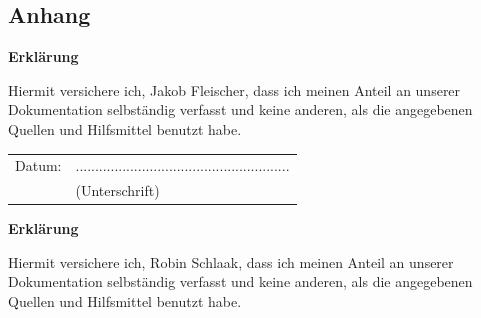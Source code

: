 \documentclass[12pt,a4paper,bibliography=totocnumbered,listof=totocnumbered]{scrartcl}
\begin{document}
\pagebreak


\renewcommand\refname{Literaturverzeichnis}


\pagebreak


\setcounter{page}{1}

\begin{appendix}

\section*{Anhang}
{}


\end{appendix}


\newpage
\thispagestyle{empty}
\begin{center}
	\vspace*{5em}
	\huge\textbf{Erklärung}\\
\end{center}
\vspace{2em}
Hiermit versichere ich, Jakob Fleischer, dass ich meinen Anteil an unserer Dokumentation selbständig verfasst und keine anderen, als die angegebenen Quellen und Hilfsmittel benutzt habe.

\vspace{4em}
\begin{minipage}{\linewidth}
	\begin{tabular}{p{15em}p{15em}}
		Datum: &  .......................................................\\
		& \centering (Unterschrift)\\
	\end{tabular}
\end{minipage}



\newpage
\thispagestyle{empty}
\begin{center}
	\vspace*{5em}
	\huge\textbf{Erklärung}\\
\end{center}
\vspace{2em}
Hiermit versichere ich, Robin Schlaak, dass ich meinen Anteil an unserer Dokumentation selbständig verfasst und keine anderen, als die angegebenen Quellen und Hilfsmittel benutzt habe.
\end{document}
